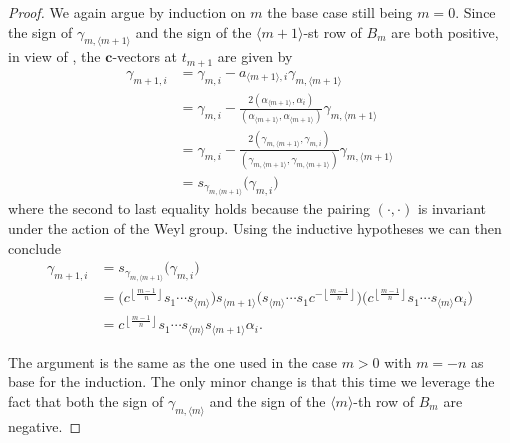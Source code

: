 \documentclass[11pt]{amsart}
\newcommand{\bfc}{\mathbf{c}}
\renewcommand{\mod}[1]{\langle {#1} \rangle}
\numberwithin{equation}{section}
\begin{document}
\begin{proof}
  We again argue by induction on $m$ the base case still being $m=0$. 
  Since the sign of $\gamma_{m,\mod{m+1}}$ and the sign of the $\mod{m+1}$-st row of $B_m$ are both positive, in view of \cite[Proposition 1.3]{NZ12}, the $\bfc$-vectors at $t_{m+1}$ are given by
  \begin{align*}
    \gamma_{m+1,i} 
    &= 
    \gamma_{m,i} - a_{\mod{m+1},i} \gamma_{m,\mod{m+1}}\\
    &=
    \gamma_{m,i} - \frac{2(\alpha_{\mod{m+1}},\alpha_i)}{(\alpha_{\mod{m+1}},\alpha_{\mod{m+1}})} \gamma_{m,\mod{m+1}}\\
    &=
    \gamma_{m,i} - \frac{2(\gamma_{m,\mod{m+1}},\gamma_{m,i})}{(\gamma_{m,\mod{m+1}},\gamma_{m,\mod{m+1}})} \gamma_{m,\mod{m+1}}\\
    &=
    s_{\gamma_{m,\mod{m+1}}}\big(\gamma_{m,i}\big)
  \end{align*}
  where the second to last equality holds because the pairing $(\cdot,\cdot)$ is invariant under the action of the Weyl group.  
  Using the inductive hypotheses we can then conclude
  \begin{align*}
    \gamma_{m+1,i} 
    &=
    s_{\gamma_{m,\mod{m+1}}}\big(\gamma_{m,i}\big)\\
    &=
    \big(c^{\left\lfloor\frac{m-1}{n}\right\rfloor}s_1\cdots s_{\mod{m}}\big)s_{\mod{m+1}}\big(s_{\mod{m}}\cdots s_1 c^{-\left\lfloor\frac{m-1}{n}\right\rfloor}\big)\big(c^{\left\lfloor\frac{m-1}{n}\right\rfloor}s_1\cdots s_{\mod{m}}\alpha_i\big)\\
    &= 
    c^{\left\lfloor\frac{m-1}{n}\right\rfloor}s_1\cdots s_{\mod{m}}s_{\mod{m+1}} \alpha_i.
  \end{align*}

  The argument is the same as the one used in the case $m>0$ with $m=-n$ as base for the induction. 
  The only minor change is that this time we leverage the fact that both the sign of $\gamma_{m,\mod{m}}$ and the sign of the $\mod{m}$-th row of $B_m$ are negative.
\end{proof}
\end{document}
